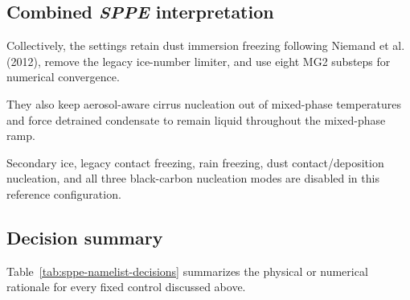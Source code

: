 \subsection*{Combined \textbf{\textit{SPPE}} interpretation}

Collectively, the settings retain dust immersion freezing following Niemand et al. (2012), remove the legacy ice-number limiter, and use eight MG2 substeps for numerical convergence.

They also keep aerosol-aware cirrus nucleation out of mixed-phase temperatures and force detrained condensate to remain liquid throughout the mixed-phase ramp.

Secondary ice, legacy contact freezing, rain freezing, dust contact/deposition nucleation, and all three black-carbon nucleation modes are disabled in this reference configuration.

\subsection*{Decision summary}

Table~\ref{tab:sppe-namelist-decisions} summarizes the physical or numerical rationale for every fixed control discussed above.

